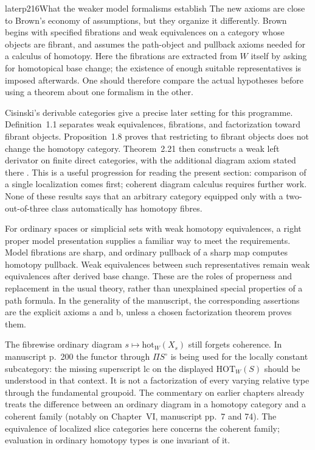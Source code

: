 \begin{dcomment}{later}{p216}{What the weaker model formalisms establish}
The new axioms are close to Brown's economy of assumptions, but they organize it differently. Brown begins with specified fibrations and weak equivalences on a category whose objects are fibrant, and assumes the path-object and pullback axioms needed for a calculus of homotopy. Here the fibrations are extracted from $W$ itself by asking for homotopical base change; the existence of enough suitable representatives is imposed afterwards. One should therefore compare the actual hypotheses before using a theorem about one formalism in the other.

Cisinski's derivable categories give a precise later setting for this programme. Definition~1.1 separates weak equivalences, fibrations, and factorization toward fibrant objects. Proposition~1.8 proves that restricting to fibrant objects does not change the homotopy category. Theorem~2.21 then constructs a weak left derivator on finite direct categories, with the additional diagram axiom stated there \citep{Cisinski2010}. This is a useful progression for reading the present section: comparison of a single localization comes first; coherent diagram calculus requires further work. None of these results says that an arbitrary category equipped only with a two-out-of-three class automatically has homotopy fibres.

For ordinary spaces or simplicial sets with weak homotopy equivalences, a right proper model presentation supplies a familiar way to meet the requirements. Model fibrations are sharp, and ordinary pullback of a sharp map computes homotopy pullback. Weak equivalences between such representatives remain weak equivalences after derived base change. These are the roles of properness and replacement in the usual theory, rather than unexplained special properties of a path formula. In the generality of the manuscript, the corresponding assertions are the explicit axioms a and b, unless a chosen factorization theorem proves them.

The fibrewise ordinary diagram $s\mapsto\mathrm{hot}_W(X_s)$ still forgets coherence. In manuscript p.~200 the functor through $\Pi S^\circ$ is being used for the locally constant subcategory: the missing superscript $\mathrm{lc}$ on the displayed $\mathrm{HOT}_W(S)$ should be understood in that context. It is not a factorization of every varying relative type through the fundamental groupoid. The commentary on earlier chapters already treats the difference between an ordinary diagram in a homotopy category and a coherent family (notably on Chapter~VI, manuscript pp.~7 and 74). The equivalence of localized slice categories here concerns the coherent family; evaluation in ordinary homotopy types is one invariant of it.
\end{dcomment}

